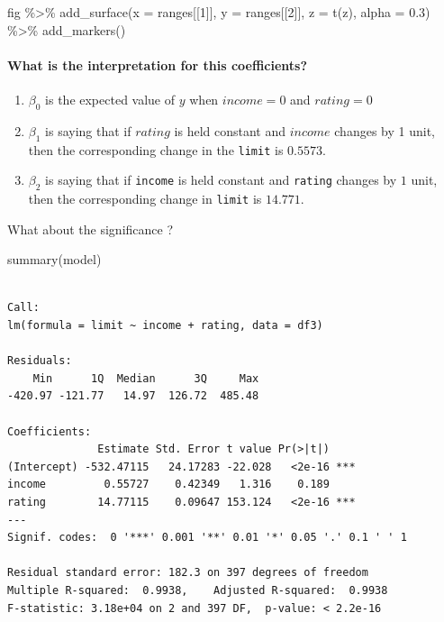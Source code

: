 \documentclass[
  letterpaper,
  DIV=11,
  numbers=noendperiod]{scrartcl}
\let\oldparagraph\paragraph
\renewcommand{\paragraph}[1]{\oldparagraph{#1}\mbox{}}
\newenvironment{Shaded}{\begin{snugshade}}{\end{snugshade}}
\newcommand{\AttributeTok}[1]{\textcolor[rgb]{0.40,0.45,0.13}{#1}}
\newcommand{\DecValTok}[1]{\textcolor[rgb]{0.68,0.00,0.00}{#1}}
\newcommand{\FloatTok}[1]{\textcolor[rgb]{0.68,0.00,0.00}{#1}}
\newcommand{\FunctionTok}[1]{\textcolor[rgb]{0.28,0.35,0.67}{#1}}
\newcommand{\NormalTok}[1]{\textcolor[rgb]{0.00,0.23,0.31}{#1}}
\newcommand{\SpecialCharTok}[1]{\textcolor[rgb]{0.37,0.37,0.37}{#1}}
\begin{document}
\begin{Shaded}
\begin{Highlighting}[]
\NormalTok{fig }\SpecialCharTok{\%\textgreater{}\%} 
    \FunctionTok{add\_surface}\NormalTok{(}\AttributeTok{x =}\NormalTok{ ranges[[}\DecValTok{1}\NormalTok{]], }\AttributeTok{y =}\NormalTok{ ranges[[}\DecValTok{2}\NormalTok{]], }\AttributeTok{z =} \FunctionTok{t}\NormalTok{(z), }
    \AttributeTok{alpha =} \FloatTok{0.3}\NormalTok{) }\SpecialCharTok{\%\textgreater{}\%} 
    \FunctionTok{add\_markers}\NormalTok{()}
\end{Highlighting}
\end{Shaded}

\hypertarget{what-is-the-interpretation-for-this-coefficients}{%
\paragraph{What is the interpretation for this
coefficients?}\label{what-is-the-interpretation-for-this-coefficients}}

\begin{enumerate}
\def\labelenumi{\arabic{enumi}.}
\item
  \(\beta_0\) is the expected value of \(y\) when \(income = 0\) and
  \(rating = 0\)
\item
  \(\beta_1\) is saying that if \(rating\) is held constant and
  \(income\) changes by 1 unit, then the corresponding change in the
  \texttt{limit} is \(0.5573\).
\item
  \(\beta_2\) is saying that if \texttt{income} is held constant and
  \texttt{rating} changes by \(1\) unit, then the corresponding change
  in \texttt{limit} is \(14.771\).
\end{enumerate}

What about the significance ?

\begin{Shaded}
\begin{Highlighting}[]
\FunctionTok{summary}\NormalTok{(model)}
\end{Highlighting}
\end{Shaded}

\begin{verbatim}

Call:
lm(formula = limit ~ income + rating, data = df3)

Residuals:
    Min      1Q  Median      3Q     Max 
-420.97 -121.77   14.97  126.72  485.48 

Coefficients:
              Estimate Std. Error t value Pr(>|t|)    
(Intercept) -532.47115   24.17283 -22.028   <2e-16 ***
income         0.55727    0.42349   1.316    0.189    
rating        14.77115    0.09647 153.124   <2e-16 ***
---
Signif. codes:  0 '***' 0.001 '**' 0.01 '*' 0.05 '.' 0.1 ' ' 1

Residual standard error: 182.3 on 397 degrees of freedom
Multiple R-squared:  0.9938,    Adjusted R-squared:  0.9938 
F-statistic: 3.18e+04 on 2 and 397 DF,  p-value: < 2.2e-16
\end{verbatim}
\end{document}
